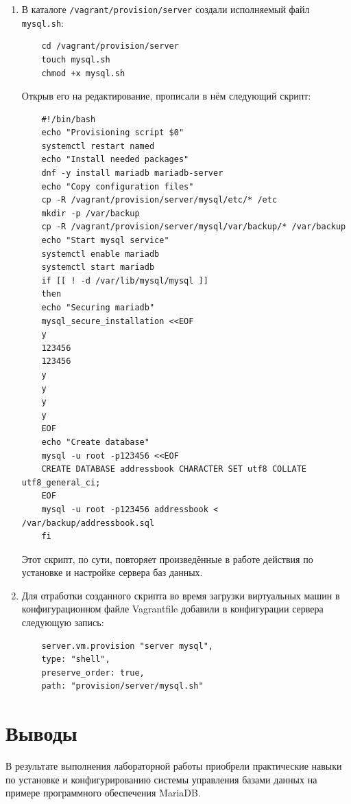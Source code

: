 \begin{enumerate}
\item В каталоге \texttt{/vagrant/provision/server} создали исполняемый файл \texttt{mysql.sh}:
  \begin{verbatim}
    cd /vagrant/provision/server
    touch mysql.sh
    chmod +x mysql.sh
  \end{verbatim}
  Открыв его на редактирование, прописали в нём следующий скрипт:
  \begin{verbatim}
    #!/bin/bash
    echo "Provisioning script $0"
    systemctl restart named
    echo "Install needed packages"
    dnf -y install mariadb mariadb-server
    echo "Copy configuration files"
    cp -R /vagrant/provision/server/mysql/etc/* /etc
    mkdir -p /var/backup
    cp -R /vagrant/provision/server/mysql/var/backup/* /var/backup
    echo "Start mysql service"
    systemctl enable mariadb
    systemctl start mariadb
    if [[ ! -d /var/lib/mysql/mysql ]]
    then
    echo "Securing mariadb"
    mysql_secure_installation <<EOF
    y
    123456
    123456
    y
    y
    y
    y
    EOF
    echo "Create database"
    mysql -u root -p123456 <<EOF
    CREATE DATABASE addressbook CHARACTER SET utf8 COLLATE utf8_general_ci;
    EOF
    mysql -u root -p123456 addressbook < /var/backup/addressbook.sql
    fi
  \end{verbatim}
  Этот скрипт, по сути, повторяет произведённые в работе действия по установке и настройке сервера баз данных.
\item Для отработки созданного скрипта во время загрузки виртуальных машин в конфигурационном файле Vagrantfile добавили в конфигурации сервера следующую запись:
  \begin{verbatim}
    server.vm.provision "server mysql",
    type: "shell",
    preserve_order: true,
    path: "provision/server/mysql.sh"
  \end{verbatim}
\end{enumerate}


\section{Выводы}
В результате выполнения лабораторной работы приобрели практические навыки по установке и конфигурированию системы управления базами данных на примере программного обеспечения MariaDB.

